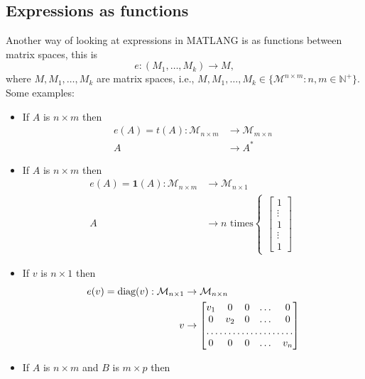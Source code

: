 \subsection{Expressions as functions}

Another way of looking at expressions in MATLANG is as functions between matrix spaces, this is $$e:(M_1, \ldots, M_k)\rightarrow M,$$ where $M,M_1,\ldots, M_k$ are matrix spaces, i.e., $M,M_1,\ldots, M_k\in\lbrace\mathcal{M}^{n\times m}: n,m\in\mathbb{N}^+\rbrace$. \\

Some examples:

\begin{itemize}
	\item If $A$ is $n\times m$ then 
		\begin{align*}
			e(A)=t(A):\mathcal{M}_{n\times m}&\rightarrow \mathcal{M}_{m\times n} \\
			A&\rightarrow A^*
		\end{align*}
	\item If $A$ is $n\times m$ then 
		\begin{align*}
			e(A)=\mathbf{1}(A):\mathcal{M}_{n\times m}&\rightarrow \mathcal{M}_{n\times 1} \\
			A&\rightarrow n\text{ times}\begin{cases}\begin{bmatrix}
    1 \\
    \vdots \\
    1 \\
    \vdots \\
    1
\end{bmatrix}\end{cases}
		\end{align*}
	\item If $v$ is $n\times 1$ then 
		\begin{align*}
			e(v)=\text{diag}(v):\mathcal{M}_{n\times 1}&\rightarrow \mathcal{M}_{n\times n} \\
			v&\rightarrow \begin{bmatrix}
			    v_{1}       & 0 & 0 & \dots & 0 \\
			    0       & v_{2} & 0 & \dots & 0 \\
			    \hdotsfor{5} \\
			    0       & 0 & 0 & \dots & v_{n}
			\end{bmatrix}
		\end{align*}
	\item If $A$ is $n\times m$ and $B$ is $m\times p$ then 

\end{itemize}
